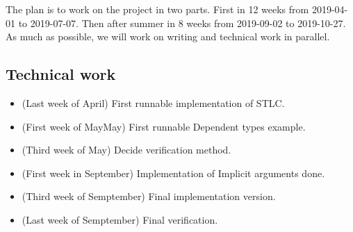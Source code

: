 \documentclass[parskip=half]{scrartcl}
\begin{document}






The plan is to work on the project in two parts. First in 12 weeks from
2019-04-01 to 2019-07-07. Then after summer in 8 weeks from 2019-09-02 to
2019-10-27. As much as possible, we will work on writing and technical work in
parallel.

\subsection{Technical work}
\begin{itemize}
  \item (Last week of April) First runnable implementation of STLC.
  \item (First week of MayMay) First runnable Dependent types example.
  \item (Third week of May) Decide verification method.
  \item (First week in September) Implementation of Implicit arguments done.
  \item (Third week of Semptember) Final implementation version.
  \item (Last week of Semptember) Final verification.
\end{itemize}
\end{document}
